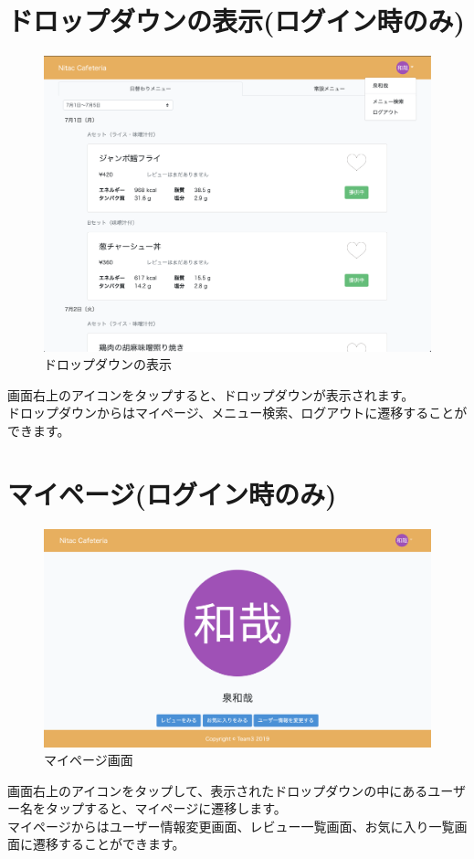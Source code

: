 \documentclass[a4paper]{jsarticle}
\begin{document}
	\section{ドロップダウンの表示(ログイン時のみ)}
\begin{figure}[htbp]
	\centering
	\includegraphics[scale = 0.22525]{image/dropdown_student.png}
	\caption{ドロップダウンの表示}
\end{figure}
画面右上のアイコンをタップすると、ドロップダウンが表示されます。\\
ドロップダウンからはマイページ、メニュー検索、ログアウトに遷移することができます。
\section{マイページ(ログイン時のみ)}
\begin{figure}[htbp]
\centering
\includegraphics[scale = 0.225]{image/mypage.png}
\caption{マイページ画面}
\end{figure}
画面右上のアイコンをタップして、表示されたドロップダウンの中にあるユーザー名をタップすると、マイページに遷移します。\\
マイページからはユーザー情報変更画面、レビュー一覧画面、お気に入り一覧画面に遷移することができます。
\end{document}
